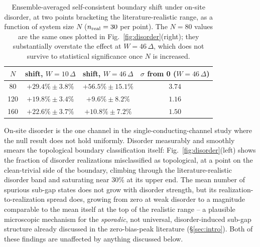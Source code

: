 \documentclass[aps,physrev,reprint,superscriptaddress,amsmath,amssymb,floatfix]{revtex4-2}
\begin{document}
\begin{table}[t]
\caption{Ensemble-averaged self-consistent boundary shift under on-site
disorder, at two points bracketing the literature-realistic range, as a
function of system size $N$ ($n_{\rm real}=30$ per point). The $N=80$
values are the same ones plotted in Fig.~\ref{fig:disorder}(right); they
substantially overstate the effect at $W=46\,\Delta$, which does not
survive to statistical significance once $N$ is increased.}
\label{tab:disorderNindep}
\begin{ruledtabular}
\begin{tabular}{cccc}
$N$ & shift, $W=10\,\Delta$ & shift, $W=46\,\Delta$ & $\sigma$ from 0 ($W=46\,\Delta$)\\
\hline
80  & $+29.4\%\pm3.8\%$  & $+56.5\%\pm15.1\%$ & $3.74$ \\
120 & $+19.8\%\pm3.4\%$  & $+9.6\%\pm8.2\%$   & $1.16$ \\
160 & $+22.6\%\pm3.7\%$  & $+10.8\%\pm7.2\%$  & $1.50$ \\
\end{tabular}
\end{ruledtabular}
\end{table}

On-site disorder is the one channel in the single-conducting-channel
study where the null result does not hold uniformly. Disorder measurably
and smoothly smears the topological boundary classification itself:
Fig.~\ref{fig:disorder}(left) shows the fraction of disorder realizations
misclassified as topological, at a point on the clean-trivial side of the
boundary, climbing through the literature-realistic disorder band and
saturating near $30\%$ at its upper end. The mean number of spurious
sub-gap states does not grow with disorder strength, but its
realization-to-realization spread does, growing from zero at weak
disorder to a magnitude comparable to the mean itself at the top of the
realistic range -- a plausible microscopic mechanism for the
\emph{sporadic}, not universal, disorder-induced sub-gap structure
already discussed in the zero-bias-peak literature (\S\ref{sec:intro}).
Both of these findings are unaffected by anything discussed below.
\end{document}
